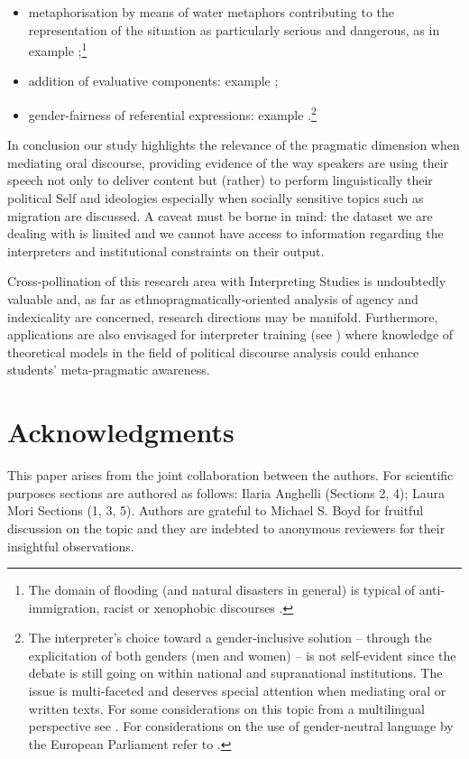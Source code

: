 \documentclass[output=paper]{langscibook}
\begin{document}
\begin{itemize}
\item 
metaphorisation by means of water metaphors contributing to the representation of the situation as particularly serious and dangerous, as in example ;\footnote{The domain of flooding (and natural disasters in general) is typical of anti-immigration, racist or xenophobic discourses \citep[88]{Semino2008}.}
\item 
addition of evaluative components: example ;
\item 
gender-fairness of referential expressions: example .\footnote{The interpreter’s choice toward a gender-inclusive solution -- through the explicitation of both genders (men and women) -- is not self-evident since the debate is still going on within national and supranational institutions. The issue is multi-faceted and deserves special attention when mediating oral or written texts. For some considerations on this topic from a multilingual perspective see \citet{CavagnoliMori2019}. For considerations on the use of gender-neutral language by the European Parliament refer to \citet{EP2018}.}
\end{itemize}

In conclusion our study highlights the relevance of the pragmatic dimension when mediating oral discourse, providing evidence of the way speakers are using their speech not only to deliver content but (rather) to perform linguistically their political Self and ideologies especially when socially sensitive topics such as migration are discussed. A caveat must be borne in mind: the dataset we are dealing with is limited and we cannot have access to information regarding the interpreters and institutional constraints on their output.

Cross-pollination of this research area with Interpreting Studies is undoubtedly valuable and, as far as ethnopragmatically-oriented analysis of agency and indexicality are concerned, research directions may be manifold. Furthermore, applications are also envisaged for interpreter training (see \citealt{BoydMonacelli2010}) where knowledge of theoretical models in the field of political discourse analysis could enhance students’ meta-pragmatic awareness. 

\section*{Acknowledgments}

This paper arises from the joint collaboration between the authors. For scientific purposes sections are authored as follows: Ilaria Anghelli (Sections 2, 4); Laura Mori Sections (1, 3, 5). Authors are grateful to Michael S. Boyd for fruitful discussion on the topic and they are indebted to anonymous reviewers for their insightful observations.
\end{document}
